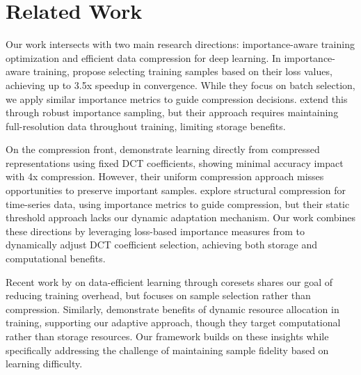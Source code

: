 \documentclass{article} %
\begin{document}
\section{Related Work}
\label{sec:related}
%
%
%
Our work intersects with two main research directions: importance-aware training optimization and efficient data compression for deep learning. In importance-aware training, \citet{Katharopoulos2018NotAS} propose selecting training samples based on their loss values, achieving up to 3.5x speedup in convergence. While they focus on batch selection, we apply similar importance metrics to guide compression decisions. \citet{Johnson2018TrainingDM} extend this through robust importance sampling, but their approach requires maintaining full-resolution data throughout training, limiting storage benefits.

On the compression front, \citet{wang2022learning} demonstrate learning directly from compressed representations using fixed DCT coefficients, showing minimal accuracy impact with 4x compression. However, their uniform compression approach misses opportunities to preserve important samples. \citet{azimi2020structural} explore structural compression for time-series data, using importance metrics to guide compression, but their static threshold approach lacks our dynamic adaptation mechanism. Our work combines these directions by leveraging loss-based importance measures from \citet{Katharopoulos2018NotAS} to dynamically adjust DCT coefficient selection, achieving both storage and computational benefits.

Recent work by \citet{Yang2023TowardsSL} on data-efficient learning through coresets shares our goal of reducing training overhead, but focuses on sample selection rather than compression. Similarly, \citet{Zhao2022MultiresourceIF} demonstrate benefits of dynamic resource allocation in training, supporting our adaptive approach, though they target computational rather than storage resources. Our framework builds on these insights while specifically addressing the challenge of maintaining sample fidelity based on learning difficulty.
%
%
%
\end{document}
